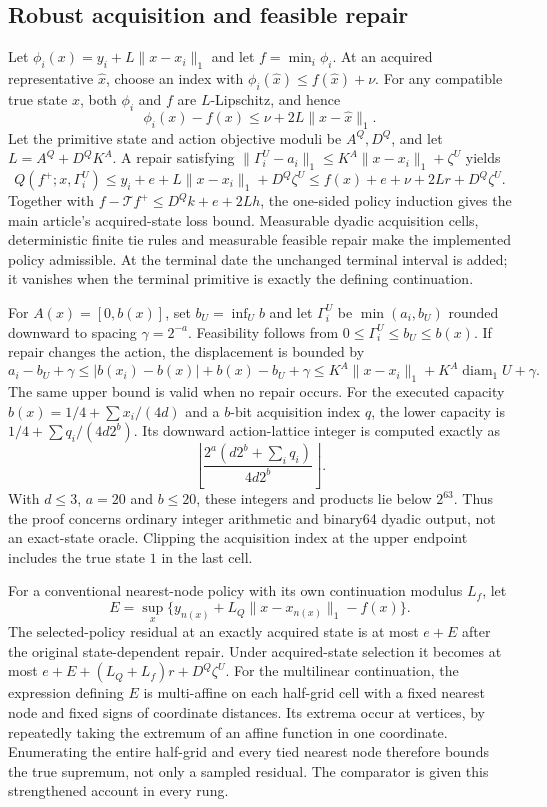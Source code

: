 \subsection{Robust acquisition and feasible repair}
Let $\phi_i(x)=y_i+L\|x-x_i\|_1$ and let $f=\min_i\phi_i$. At an acquired representative $\widehat x$, choose an index with $\phi_i(\widehat x)\le f(\widehat x)+\nu$. For any compatible true state $x$, both $\phi_i$ and $f$ are $L$-Lipschitz, and hence
\[
 \phi_i(x)-f(x)\le\nu+2L\|x-\widehat x\|_1.
\]
Let the primitive state and action objective moduli be $A^Q,D^Q$, and let $L=A^Q+D^QK^A$. A repair satisfying
$\|\Gamma_i^U-a_i\|_1\le K^A\|x-x_i\|_1+\zeta^U$ yields
\[
 Q(f^+;x,\Gamma_i^U)\le y_i+e+L\|x-x_i\|_1+D^Q\zeta^U
 \le f(x)+e+\nu+2Lr+D^Q\zeta^U.
\]
Together with $f-\mathcal Tf^+\le D^Qk+e+2Lh$, the one-sided policy induction gives the main article's acquired-state loss bound. Measurable dyadic acquisition cells, deterministic finite tie rules and measurable feasible repair make the implemented policy admissible. At the terminal date the unchanged terminal interval is added; it vanishes when the terminal primitive is exactly the defining continuation.

For $A(x)=[0,b(x)]$, set $b_U=\inf_U b$ and let $\Gamma_i^U$ be $\min(a_i,b_U)$ rounded downward to spacing $\gamma=2^{-a}$. Feasibility follows from $0\le\Gamma_i^U\le b_U\le b(x)$. If repair changes the action, the displacement is bounded by
\[
 a_i-b_U+\gamma
 \le |b(x_i)-b(x)|+b(x)-b_U+\gamma
 \le K^A\|x-x_i\|_1+K^A\operatorname{diam}_1U+\gamma.
\]
The same upper bound is valid when no repair occurs. For the executed capacity $b(x)=1/4+\sum x_i/(4d)$ and a $b$-bit acquisition index $q$, the lower capacity is
$1/4+\sum q_i/(4d2^b)$. Its downward action-lattice integer is computed exactly as
\[
 \left\lfloor\frac{2^a(d2^b+\sum_iq_i)}{4d2^b}\right\rfloor.
\]
With $d\le3$, $a=20$ and $b\le20$, these integers and products lie below $2^{63}$. Thus the proof concerns ordinary integer arithmetic and binary64 dyadic output, not an exact-state oracle. Clipping the acquisition index at the upper endpoint includes the true state $1$ in the last cell.

For a conventional nearest-node policy with its own continuation modulus $L_f$, let
\[
 E=\sup_x\{y_{n(x)}+L_Q\|x-x_{n(x)}\|_1-f(x)\}.
\]
The selected-policy residual at an exactly acquired state is at most $e+E$ after the original state-dependent repair. Under acquired-state selection it becomes at most
$e+E+(L_Q+L_f)r+D^Q\zeta^U$.
For the multilinear continuation, the expression defining $E$ is multi-affine on each half-grid cell with a fixed nearest node and fixed signs of coordinate distances. Its extrema occur at vertices, by repeatedly taking the extremum of an affine function in one coordinate. Enumerating the entire half-grid and every tied nearest node therefore bounds the true supremum, not only a sampled residual. The comparator is given this strengthened account in every rung.

